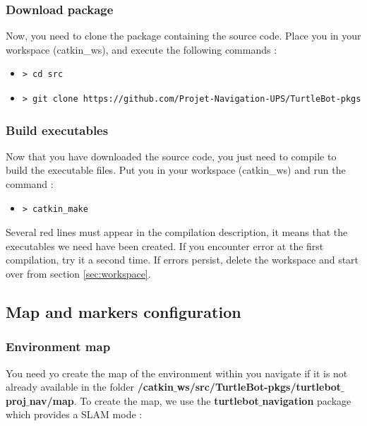 \documentclass[10pt,a4paper]{article}
\begin{document}
\subsubsection{Download package}

Now, you need to clone the package containing the source code. Place you in your workspace (catkin\_ws), and execute the following commands :

\begin{itemize}
\item[]  \begin{verbatim}> cd src \end{verbatim}
\item[]  \begin{verbatim}> git clone https://github.com/Projet-Navigation-UPS/TurtleBot-pkgs \end{verbatim}
\end{itemize}

\subsubsection{Build executables}

Now that you have downloaded the source code, you just need to compile to build the executable files. Put you in your workspace (catkin\_ws) and run the command : 

\begin{itemize}
\item[]  \begin{verbatim}> catkin_make \end{verbatim}
\end{itemize}

Several red lines must appear in the compilation description, it means that the executables we need have been created. If you encounter error at the first compilation, try it a second time. If errors persist, delete the workspace and start over from section \ref{sec:workspace}. 

\subsection{Map and markers configuration}
\label{sec:mapAndMarkersConfig}

\subsubsection{Environment map}

You need yo create the map of the environment within you navigate if it is not already available in the folder \textbf{/catkin$\_$ws/src/TurtleBot-pkgs/turtlebot$\_$proj$\_$nav/map}. To create the map, we use the \textbf{turtlebot$\_$navigation} package which provides a SLAM mode :
\end{document}
